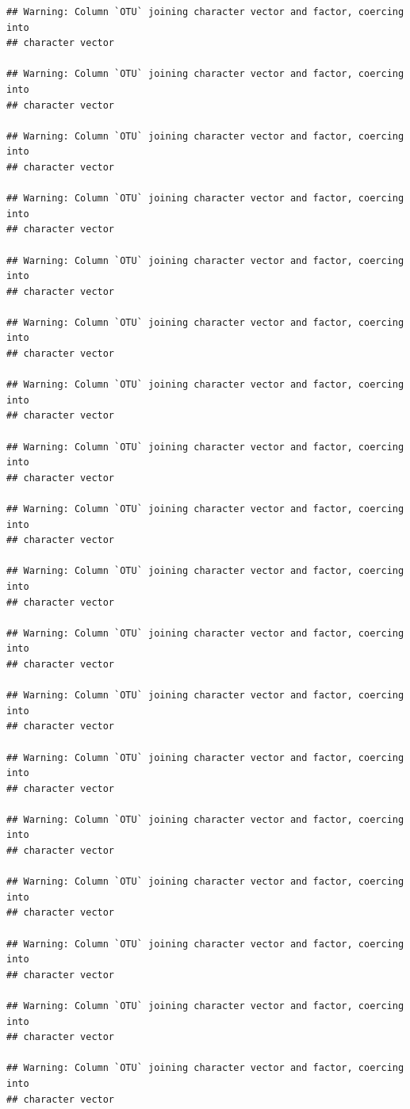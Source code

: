\documentclass[]{article}
\begin{document}
\begin{verbatim}
## Warning: Column `OTU` joining character vector and factor, coercing into
## character vector

## Warning: Column `OTU` joining character vector and factor, coercing into
## character vector

## Warning: Column `OTU` joining character vector and factor, coercing into
## character vector

## Warning: Column `OTU` joining character vector and factor, coercing into
## character vector

## Warning: Column `OTU` joining character vector and factor, coercing into
## character vector

## Warning: Column `OTU` joining character vector and factor, coercing into
## character vector

## Warning: Column `OTU` joining character vector and factor, coercing into
## character vector

## Warning: Column `OTU` joining character vector and factor, coercing into
## character vector

## Warning: Column `OTU` joining character vector and factor, coercing into
## character vector

## Warning: Column `OTU` joining character vector and factor, coercing into
## character vector

## Warning: Column `OTU` joining character vector and factor, coercing into
## character vector

## Warning: Column `OTU` joining character vector and factor, coercing into
## character vector

## Warning: Column `OTU` joining character vector and factor, coercing into
## character vector

## Warning: Column `OTU` joining character vector and factor, coercing into
## character vector

## Warning: Column `OTU` joining character vector and factor, coercing into
## character vector

## Warning: Column `OTU` joining character vector and factor, coercing into
## character vector

## Warning: Column `OTU` joining character vector and factor, coercing into
## character vector

## Warning: Column `OTU` joining character vector and factor, coercing into
## character vector
\end{verbatim}
\end{document}
